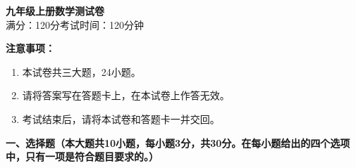 \documentclass[12pt, a4paper]{ctexart}
\begin{document}
\begin{center}
{\LARGE\bfseries 九年级上册数学测试卷}\\[0.5em]
{\large 满分：120分\quad 考试时间：120分钟}
\end{center}

\vspace{0.5em}
\noindent\textbf{注意事项：}
\begin{enumerate}[label=\arabic*., leftmargin=2em]
\item 本试卷共三大题，24小题。
\item 请将答案写在答题卡上，在本试卷上作答无效。
\item 考试结束后，请将本试卷和答题卡一并交回。
\end{enumerate}

\vspace{0.5em}

\noindent\textbf{一、选择题（本大题共10小题，每小题3分，共30分。在每小题给出的四个选项中，只有一项是符合题目要求的。）}
\end{document}
